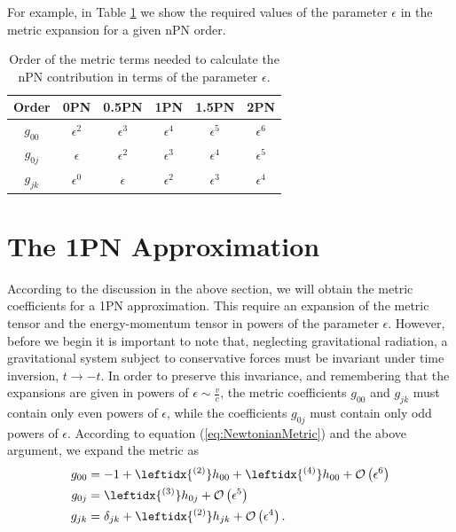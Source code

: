For example,  in Table \ref{tab:nPNOrder} we show the required values of the parameter $\epsilon$  in the metric expansion for a given nPN order.

\begin{table}[h]
\begin{center}
\begin{tabular}{|c|c|c|c|c|c|}
\hline
Order & 0PN & 0.5PN & 1PN & 1.5PN & 2PN \\
\hline
$g_{00}$ & $\epsilon^2$ & $\epsilon^3$ &  $\epsilon^4$& $\epsilon^5$ & $\epsilon^6$ \\
$g_{0j}$ & $\epsilon$  & $\epsilon^2$ & $\epsilon^3$ & $\epsilon^4$  & $\epsilon^5$  \\ 
$g_{jk}$ & $\epsilon^0$ & $\epsilon$  & $\epsilon^2$ & $\epsilon^3$ & $\epsilon^4$ \\
\hline
\end{tabular}
\caption{ Order of the metric terms needed to calculate the nPN contribution in terms of the parameter $\epsilon$.}
\label{tab:nPNOrder}
\end{center}
\end{table}

\section{The 1PN Approximation}
According to the discussion in the above section, we will obtain the metric coefficients for a 1PN approximation. This require an expansion of the metric tensor and the energy-momentum tensor in powers of the parameter $\epsilon$. However, before we begin it is important to note that, neglecting gravitational radiation, a gravitational system subject to conservative forces must be invariant under time inversion, $t \rightarrow -t$. In order to preserve this invariance, and remembering that the expansions are given in powers of $\epsilon \sim \frac{v}{c} $,  the metric coefficients $g_{00}$ and $g_{jk}$ must contain only even powers of $\epsilon$, while the coefficients $g_{0j}$ must contain only odd powers of $\epsilon$. According to equation (\ref{eq:NewtonianMetric}) and the above argument, we expand the metric as
\begin{subequations}\label{eq:PNMetricInitial}
\begin{align}
g_{00} &= -1 + \leftidx{^{(2)}}h_{00} + \leftidx{^{(4)}}h_{00} + \mathcal{O} \left( \epsilon^6 \right) \\
g_{0j} &= \leftidx{^{(3)}}h_{0j} +  \mathcal{O} \left( \epsilon^5 \right)  \\
g_{jk} &= \delta_{jk} + \leftidx{^{(2)}}h_{jk} + \mathcal{O} \left( \epsilon^4 \right) .
\end{align}
\end{subequations}

